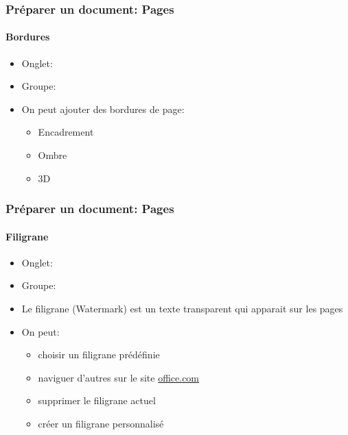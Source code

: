 \documentclass[xcolor=table]{beamer}
\begin{document}
\begin{frame}[t]
\frametitle{Préparer un document: Pages}
\framesubtitle{Bordures}

\begin{minipage}{0.49\textwidth}
	\begin{itemize}
		\item Onglet: 
		\item Groupe: 
		\item On peut ajouter des bordures de page:
		\begin{itemize}
			\item Encadrement
			\item Ombre
			\item 3D
		\end{itemize}
	\end{itemize}
\end{minipage}
\begin{minipage}{0.50\textwidth}
\end{minipage}

\end{frame}

\begin{frame}[t]
\frametitle{Préparer un document: Pages}
\framesubtitle{Filigrane}

\begin{minipage}{0.49\textwidth}
	\begin{itemize}
		\item Onglet: 
		\item Groupe: 
		\item Le filigrane (Watermark) est un texte transparent qui apparait sur les pages
		\item On peut: 
		\begin{itemize}
			\item choisir un filigrane prédéfinie
			\item naviguer d'autres sur le site \url{office.com}
			\item supprimer le filigrane actuel 
			\item créer un filigrane personnalisé
		\end{itemize}
	\end{itemize}
\end{minipage}
\begin{minipage}{0.50\textwidth}
\end{minipage}

\end{frame}
\end{document}
